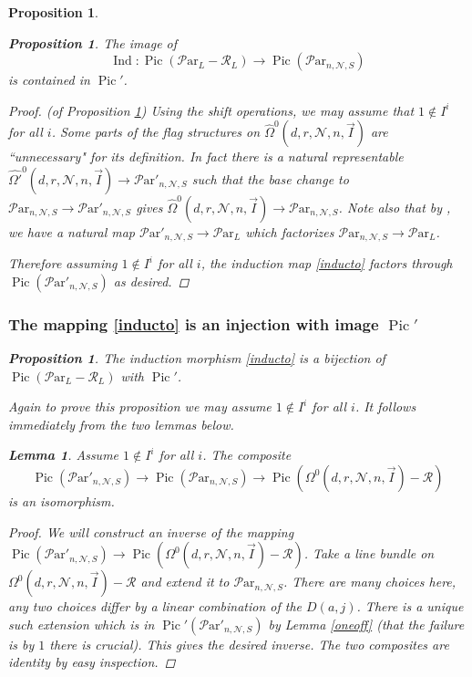 \documentclass[11pt]{amsart}
\newcommand\op{\operatorname}
\newcommand\Pic{\operatorname{Pic}}
\newcommand\mn{\mathcal{N}}
\newcommand\ParL{\mathcal{P}\text{ar}_L}
\newcommand\Par{\mathcal{P}\text{ar} }
\newtheorem{proposition}[theorem]{Proposition}
\newtheorem{lemma}[theorem]{Lemma}
\numberwithin{theorem}{subsection}
\begin{document}
{\begin{proposition}
\begin{proposition}\label{grill}
The image of
$$\op{Ind}:\Pic(\ParL -\mathcal{R}_L)\to \Pic(\Par_{n,\mathcal{N},S})$$
 is contained in  $\Pic'$.
\end{proposition}
\begin{proof}(of Proposition \ref{grill})
Using the shift operations, we may assume that $1\not\in I^i$ for all $i$.
Some parts of the flag structures on $\widehat{\Omega}^0(d,r,\mn,n,\vec{I})$ are ``unnecessary" for its definition. In fact there is a natural  representable $\widehat{\Omega'}^0(d,r,\mn,n,\vec{I})\to \Par'_{n,\mn,S}$ such that the base change to $\Par_{n,\mn,S}\to\Par'_{n,\mn,S}$ gives $\widehat{\Omega}^0(d,r,\mn,n,\vec{I})\to \Par_{n,\mn,S}$. Note also that by \cite[Lemma 7.10]{BHermit}, we have a natural map $\Par'_{n,\mn,S}\to \ParL$ which factorizes $\Par_{n,\mn,S}\to \ParL$.

Therefore assuming $1\not\in I^i$ for all $i$, the induction map \eqref{inducto} factors through  $\Pic(\Par'_{n,\mn,S})$ as desired.
\end{proof}


 \subsubsection{The mapping  \eqref{inducto} is an injection with image $\Pic'$}
\begin{proposition}\label{outside}
The induction morphism \eqref{inducto} is a bijection of $\Pic(\ParL -\mathcal{R}_L)$ with $\Pic'$.
\end{proposition}

Again to prove this proposition we may assume  $1\not\in I^i$ for all $i$. It follows immediately from the two lemmas below.

\begin{lemma}\label{later}
Assume $1\not\in I^i$ for all $i$.
The composite
$$\Pic(\Par'_{n,\mn,S})\to \Pic(\Par_{n,\mn,S})\to  \Pic({\Omega}^0(d,r,\mn,n,\vec{I})-\mathcal{R})$$ is an isomorphism.
\end{lemma}
\begin{proof}
We will construct an inverse of the mapping $\Pic(\Par'_{n,\mn,S})\to  \Pic({\Omega}^0(d,r,\mn,n,\vec{I})-\mathcal{R})$. Take a line bundle on ${\Omega}^0(d,r,\mn,n,\vec{I})-\mathcal{R}$ and extend it to $\Par_{n,\mn,S}$. There are many choices here, any two choices differ by a linear combination of the $D(a,j)$. There is a unique such extension which is in $\Pic'(\Par'_{n,\mn,S})$ by Lemma \ref{oneoff} (that the failure is by $1$  there is crucial). This gives the desired inverse. The two composites are identity by easy inspection.
\end{proof}


\end{proposition}}
\end{document}
